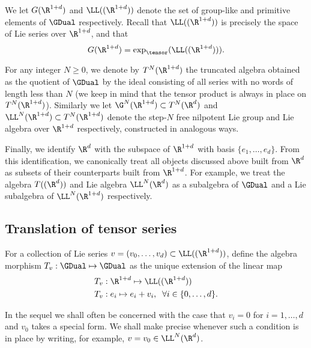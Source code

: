 \documentclass{article}
\begin{document}
We let $G(\R^{1+d})$ and $\LL((\R^{1+d}))$ denote the set of group-like and primitive elements of $\GDual$ respectively. Recall that $\LL((\R^{1+d}))$ is precisely the space of Lie series over $\R^{1+d}$, and that
\[
G(\R^{1+d}) = \exp_\tensor(\LL((\R^{1+d}))).
\]

For any integer $N \geq 0$, we denote by $T^N(\R^{1+d})$ the truncated algebra obtained as the quotient of $\GDual$ by the ideal consisting of all series with no words of length less than $N$ (we keep in mind that the tensor product is always in place on $T^N(\R^{1+d})$). Similarly we let $\G^N(\R^{1+d}) \subset T^N(\R^d)$ and $\LL^N(\R^{1+d}) \subset T^N(\R^{1+d})$ denote the step-$N$ free nilpotent Lie group and Lie algebra over $\R^{1+d}$ respectively, constructed in analogous ways.

Finally, we identify $\R^d$ with the subspace of $\R^{1+d}$ with basis $\{e_1,\ldots, e_d\}$. From this identification, we canonically treat all objects discussed above built from $\R^d$ as subsets of their counterparts built from $\R^{1+d}$.
For example, we treat the algebra $T((\R^d))$ and Lie algebra $\LL^N(\R^d)$ as a subalgebra of $\GDual$ and a Lie subalgebra of $\LL^N(\R^{1+d})$ respectively.


\subsection{Translation of tensor series}\label{subsec:TensorTranslate}


\begin{definition}
For a collection of Lie series $v = (v_0,\ldots, v_d)\subset \LL((\R^{1+d}))$, define the algebra morphism $T_v : \GDual \mapsto \GDual$ as the unique extension of the linear map
\begin{align*}
T_v &: \R^{1+d} \mapsto \LL((\R^{1+d})) \\
T_v &: e_i \mapsto e_i + v_i, \; \; \forall i \in \{0,\ldots, d\}.
\end{align*}
\end{definition}


In the sequel we shall often be concerned with the case that $v_i = 0$ for $i = 1,\ldots, d$ and $v_0$ takes a special form. We shall make precise whenever such a condition is in place by writing, for example, $v = v_0 \in \LL^N(\R^{d})$.
\end{document}
